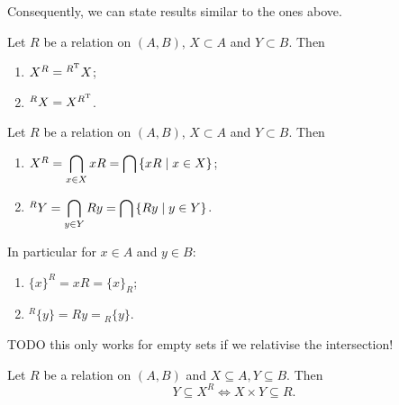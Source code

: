 Consequently, we can state results similar to the ones above.

\begin{lemma}
Let $R$ be a relation on $(A, B)$, $X\subset A$ and $Y\subset B$. Then
\begin{enumerate}
\item $X^R = {^{R^{\mathrm{T}}}X}$;
\item $^RX = X^{R^{\mathrm{T}}}$.
\end{enumerate}
\end{lemma}

\begin{lemma} \label{boundsFromPrincipalImages}
Let $R$ be a relation on $(A, B)$, $X\subset A$ and $Y\subset B$. Then
\begin{enumerate}
\item $X^R = \displaystyle\bigcap_{x\in X}xR = \bigcap \left\{ xR \;\middle|\; x\in X \right\}$;
\item $^RY = \displaystyle\bigcap_{y\in Y}Ry = \bigcap \left\{ Ry \;\middle|\; y\in Y \right\}$.
\end{enumerate}
In particular for $x\in A$ and $y\in B$:
\begin{enumerate}
\item $\{x\}^R = xR = \{x\}_R$;
\item $^R\{y\} = Ry = {_R\{y\}}$.
\end{enumerate}
\end{lemma}
TODO this only works for empty sets if we relativise the intersection!

\begin{lemma} \label{polarsCartesianProduct}
Let $R$ be a relation on $(A,B)$ and $X\subseteq A, Y\subseteq B$. Then
\[ Y\subseteq X^R \iff X\times Y \subseteq R. \]
\end{lemma}


